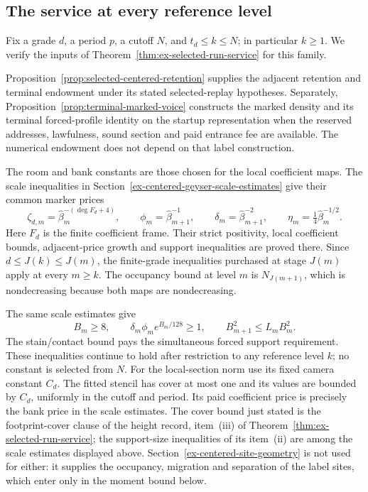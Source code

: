 \subsection{The service at every reference level}
Fix a grade $d$, a period $p$, a cutoff $N$, and
$t_d\le k\le N$; in particular $k\ge1$. We verify the inputs of
Theorem~\ref{thm:ex-selected-run-service} for this family.

Proposition~\ref{prop:selected-centered-retention} supplies the adjacent
retention and terminal endowment under its stated selected-replay
hypotheses. Separately,
Proposition~\ref{prop:terminal-marked-voice} constructs the marked density
and its terminal forced-profile identity on the startup representation
when the reserved addresses, lawfulness, sound section and paid
entrance fee are available. The numerical endowment does not depend
on that label construction.

The room and bank constants are those chosen for the local
coefficient maps. The scale inequalities in
Section~\ref{ex-centered-geyser-scale-estimates} give their common
marker prices
\[
 \zeta_{d,m}=\widehat\beta_m^{-(\deg F_d+4)},\qquad
 \phi_m=\widehat\beta_{m+1}^{-1},\qquad
 \delta_m=\widehat\beta_{m+1}^{-2},\qquad
 \eta_m=\tfrac14\widehat\beta_m^{-1/2}.
\]
Here $F_d$ is the finite coefficient frame. Their strict positivity,
local coefficient bounds, adjacent-price growth and support inequalities
are proved there. Since $d\le J(k)\le J(m)$, the finite-grade
inequalities purchased at stage $J(m)$ apply at every $m\ge k$.
The occupancy bound at level $m$ is $N_{J(m+1)}$, which is
nondecreasing because both maps are nondecreasing.

The same scale estimates give
\[
 B_m\ge8,\qquad
 \delta_m\phi_m e^{B_m/128}\ge1,\qquad
 B_{m+1}^2\le L_mB_m^2.
\]
The stain/contact bound pays the simultaneous forced support
requirement. These inequalities continue to hold after restriction
to any reference level $k$; no constant is selected from $N$.
For the local-section norm use its fixed camera constant $C_d$.
The fitted stencil has cover at most one and its values are bounded
by $C_d$, uniformly in the cutoff and period. Its paid coefficient
price is precisely the bank price in the scale estimates. The
cover bound just stated is the footprint-cover clause of the height
record, item~(iii) of Theorem~\ref{thm:ex-selected-run-service}; the
support-size inequalities of its item~(ii) are among the scale
estimates displayed above. Section~\ref{ex-centered-site-geometry}
is not used for either: it supplies the occupancy, migration and
separation of the label sites, which enter only in the moment
bound below.

